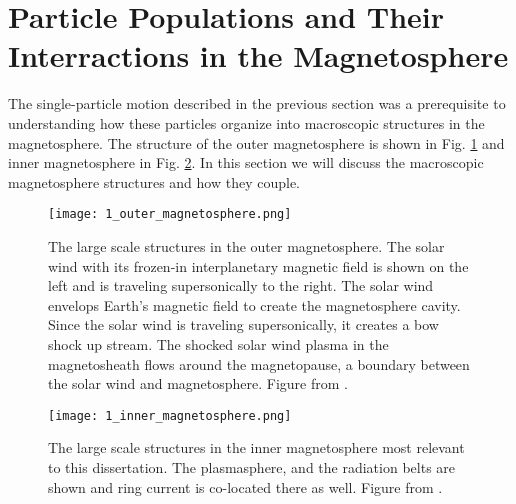 \section{Particle Populations and Their Interractions in the Magnetosphere}\label{ntro:particle_populations}
The single-particle motion described in the previous section was a prerequisite to understanding how these particles organize into macroscopic structures in the magnetosphere. The structure of the outer magnetosphere is shown in Fig. \ref{Intro:outer_magnetosphere} and inner magnetosphere in Fig. \ref{Intro:inner_magnetosphere}. In this section we will discuss the macroscopic magnetosphere structures and how they couple.

\begin{figure}
\texttt{[image: 1\_outer\_magnetosphere.png]}
\caption{The large scale structures in the outer magnetosphere. The solar wind with its frozen-in interplanetary magnetic field is shown on the left and is traveling supersonically to the right. The solar wind envelops Earth's magnetic field to create the magnetosphere cavity. Since the solar wind is traveling supersonically, it creates a bow shock up stream. The shocked solar wind plasma in the magnetosheath flows around the magnetopause, a boundary between the solar wind and magnetosphere. Figure from \citet{Baumjohann1997}.}
\label{Intro:outer_magnetosphere}
\end{figure}

\begin{figure}
\texttt{[image: 1\_inner\_magnetosphere.png]}
\caption{The large scale structures in the inner magnetosphere most relevant to this dissertation. The plasmasphere, and the radiation belts are shown and ring current is co-located there as well. Figure from \citet{Baumjohann1997}.}
\label{Intro:inner_magnetosphere}
\end{figure}

